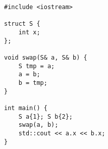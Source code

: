 \begin{lstlisting}[title=\href{https://godbolt.org/z/P6t_eR}{\texttt{godbolt.org/z/P6t\_eR}}]
#include <iostream>

struct S { 
    int x;
};

void swap(S& a, S& b) {
    S tmp = a;
    a = b;
    b = tmp;
}

int main() {
    S a{1}; S b{2};
    swap(a, b);
    std::cout << a.x << b.x;
}
\end{lstlisting}
